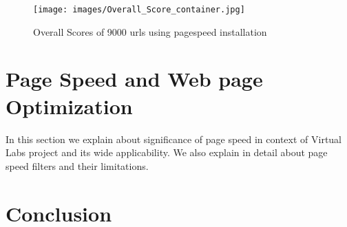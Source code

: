 \documentclass[a4paper,10pt]{IEEEtran}
\begin{document}
\begin{figure}[ht]
 \centering
\texttt{[image: images/Overall\_Score\_container.jpg]}
\caption{Overall Scores of 9000 urls using pagespeed installation}
\label{fig2}
\end{figure}

\section{Page Speed and Web page Optimization}
In this section we explain about significance of page speed in context of Virtual Labs project and its wide applicability. We also explain
in detail about page speed filters and their limitations. 

\section{Conclusion}
\end{document}
